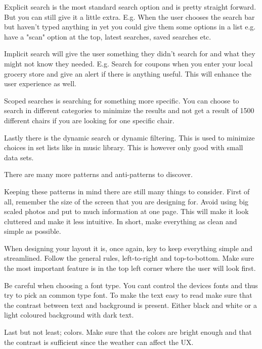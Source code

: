 Explicit search is the most standard search option and is pretty straight forward. But you can still give it a little extra. E.g. When the user chooses the search bar but haven't typed anything in yet you could give them some options in a list e.g. have a "scan" option at the top, latest searches, saved searches etc. \cite{Pattern}

Implicit search will give the user something they didn't search for and what they might not know they needed. E.g. Search for coupons when you enter your local grocery store and give an alert if there is anything useful. This will enhance the user experience as well. \cite{Pattern}

Scoped searches is searching for something more specific. You can choose to search in different categories to minimize the results and not get a result of 1500 different chairs if you are looking for one specific chair. \cite{Pattern}

Lastly there is the dynamic search or dynamic filtering. This is used to minimize choices in set lists like in music library. This is however only good with small data sets.\cite{Pattern}

There are many more patterns and anti-patterns to discover. \cite{Pattern}

Keeping these patterns in mind there are still many things to consider. 
First of all, remember the size of the screen that you are designing for. Avoid using big scaled photos and put to much information at one page. This will make it look cluttered and make it less intuitive. \cite{Graphic}
In short, make everything as clean and simple as possible. 

When designing your layout it is, once again, key to keep everything simple and streamlined. 
Follow the general rules, left-to-right and top-to-bottom. Make sure the most important feature is in the top left corner where the user will look first.\cite{Graphic}

Be careful when choosing a font type. You cant control the devices fonts and thus try to pick an common type font.  \cite{Graphic} To make the text easy to read make sure that the contrast between text and background is present. Either black and white or a light coloured background with dark text. \cite{Graphic}

Last but not least; colors. Make sure that the colors are bright enough and that the contrast is sufficient since the weather can affect the UX. \cite{Graphic}


